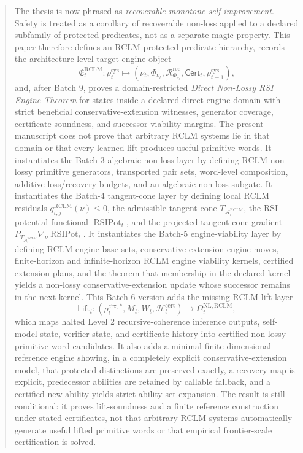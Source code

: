 \documentclass[11pt,a4paper]{article}
\newcommand{\Acal}{\mathcal A}
\newcommand{\RCLM}{\mathrm{RCLM}}
\newcommand{\sys}{\mathrm{sys}}
\newcommand{\ctx}{\mathrm{ctx}}
\newcommand{\rec}{\mathrm{rec}}
\newcommand{\cert}{\mathrm{cert}}
\newcommand{\NL}{\mathrm{NL}}
\newcommand{\RSIPot}{\operatorname{RSIPot}}
\begin{document}
\begin{abstract}
The thesis is now phrased as \emph{recoverable monotone self-improvement}.  Safety is treated as a corollary of recoverable non-loss applied to a declared subfamily of protected predicates, not as a separate magic property.  This paper therefore defines an RCLM protected-predicate hierarchy, records the architecture-level target engine object
\[
\mathfrak E_t^{\RCLM}:\rho_t^{\sys}\mapsto(\nu_t,\Phi_{\nu_t},\mathcal R_{\Phi_{\nu_t}}^{\rec},\mathsf{Cert}_t,\rho_{t+1}^{\sys}),
\]
and, after Batch 9, proves a domain-restricted \emph{Direct Non-Lossy RSI Engine Theorem} for states inside a declared direct-engine domain with strict beneficial conservative-extension witnesses, generator coverage, certificate soundness, and successor-viability margins.  The present manuscript does not prove that arbitrary RCLM systems lie in that domain or that every learned lift produces useful primitive words.  It instantiates the Batch-3 algebraic non-loss layer by defining RCLM non-lossy primitive generators, transported pair sets, word-level composition, additive loss/recovery budgets, and an algebraic non-loss subgate.  It instantiates the Batch-4 tangent-cone layer by defining local RCLM residuals \(q_{t,j}^{\RCLM}(\nu)\le0\), the admissible tangent cone \(T_{\Acal_t^{\RCLM}}\), the RSI potential functional \(\RSIPot_t\), and the projected tangent-cone gradient \(P_{T_{\Acal_t^{\RCLM}}}\nabla_\nu\RSIPot_t\).  It instantiates the Batch-5 engine-viability layer by defining RCLM engine-base sets, conservative-extension engine moves, finite-horizon and infinite-horizon RCLM engine viability kernels, certified extension plans, and the theorem that membership in the declared kernel yields a non-lossy conservative-extension update whose successor remains in the next kernel.  This Batch-6 version adds the missing RCLM lift layer
\[
\mathsf{Lift}_t:(\rho_t^{\ctx,*},M_t,W_t,\mathcal H_t^{\cert})\to\Omega_t^{\NL,\RCLM},
\]
which maps halted Level 2 recursive-coherence inference outputs, self-model state, verifier state, and certificate history into certified non-lossy primitive-word candidates.  It also adds a minimal finite-dimensional reference engine showing, in a completely explicit conservative-extension model, that protected distinctions are preserved exactly, a recovery map is explicit, predecessor abilities are retained by callable fallback, and a certified new ability yields strict ability-set expansion.  The result is still conditional: it proves lift-soundness and a finite reference construction under stated certificates, not that arbitrary RCLM systems automatically generate useful lifted primitive words or that empirical frontier-scale certification is solved.


\end{abstract}
\end{document}
